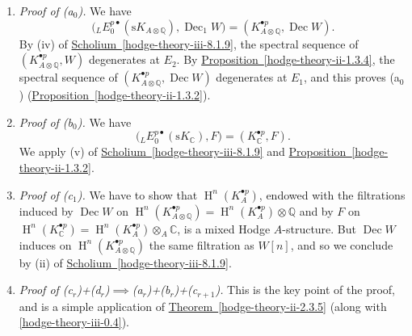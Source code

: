     
 \begin{enumerate}
      
 \item[(A)]
        \emph{Proof of (a\({}_0\)).}
        We have
        \[           \big ( {}_LE_0^{p\bullet }(\mathrm {s} K_{A\otimes \mathbb {Q}}), \operatorname {Dec}_1 W \big )           = (K_{A\otimes \mathbb {Q}}^{\bullet  p}, \operatorname {Dec} W).         \]
        By (iv) of \hyperref[hodge-theory-iii-8.1.9]{Scholium~\ref*{hodge-theory-iii-8.1.9}}, the spectral sequence of \((K_{A\otimes \mathbb {Q}}^{\bullet  p},W)\) degenerates at \(E_2\).
        By \hyperref[hodge-theory-ii-1.3.4]{Proposition~\ref*{hodge-theory-ii-1.3.4}}, the spectral sequence of \((K_{A\otimes \mathbb {Q}}^{\bullet  p},\operatorname {Dec} W)\) degenerates at \(E_1\), and this proves (a\({}_0\)) (\hyperref[hodge-theory-ii-1.3.2]{Proposition~\ref*{hodge-theory-ii-1.3.2}}).
      


      
 \item[(B)]
        
        \emph{Proof of (b\({}_0\)).}
        We have
        \[           \big ( {}_LE_0^{p\bullet }(\mathrm {s} K_\mathbb {C}),F \big )           = (K_\mathbb {C}^{\bullet  p}, F).         \]
        We apply (v) of \hyperref[hodge-theory-iii-8.1.9]{Scholium~\ref*{hodge-theory-iii-8.1.9}} and \hyperref[hodge-theory-ii-1.3.2]{Proposition~\ref*{hodge-theory-ii-1.3.2}}.
      


      
 \item[(C)]
        \emph{Proof of (c\({}_1\)).}
        We have to show that \(\operatorname {H}^n(K_A^{\bullet  p})\), endowed with the filtrations induced by \(\operatorname {Dec} W\) on \(\operatorname {H}^n(K_{A\otimes \mathbb {Q}}^{\bullet  p})=\operatorname {H}^n(K_A^{\bullet  p})\otimes \mathbb {Q}\) and by \(F\) on \(\operatorname {H}^n(K_\mathbb {C}^{\bullet  p})=\operatorname {H}^n(K_A^{\bullet  p})\otimes _A\mathbb {C}\), is a mixed Hodge \(A\)-structure.
        But \(\operatorname {Dec} W\) induces on \(\operatorname {H}^n(K_{A\otimes \mathbb {Q}}^{\bullet  p})\) the same filtration as \(W[n]\), and so we conclude by (ii) of \hyperref[hodge-theory-iii-8.1.9]{Scholium~\ref*{hodge-theory-iii-8.1.9}}.
      


      
 \item[(D)]
        \emph{Proof of (c\({}_r\))+(d\({}_r\))\(\implies \)(a\({}_r\))+(b\({}_r\))+(c\({}_{r+1}\)).}
        This is the key point of the proof, and is a simple application of \hyperref[hodge-theory-ii-2.3.5]{Theorem~\ref*{hodge-theory-ii-2.3.5}} (along with \cref{hodge-theory-iii-0.4}).
      



\end{enumerate}
